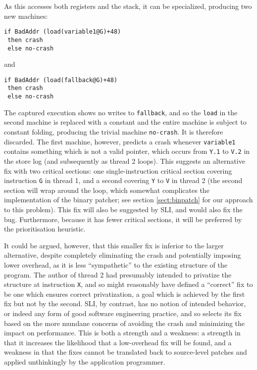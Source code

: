 \documentclass[10pt,twocolumn,preprint,natbib,authoryear]{sigplanconf}
\begin{document}
As this accesses both registers and the stack, it can be specialized,
producing two new machines:

\begin{verbatim}
if BadAddr (load(variable1@G)+48)
 then crash
 else no-crash
\end{verbatim}

and

\begin{verbatim}
if BadAddr (load(fallback@G)+48)
 then crash
 else no-crash
\end{verbatim}

The captured execution shows no writes to \verb|fallback|, and so the
\verb|load| in the second machine is replaced with a constant and the
entire machine is subject to constant folding, producing the trivial
machine \verb|no-crash|.  It is therefore discarded.  The first
machine, however, predicts a crash whenever \verb|variable1| contains
something which is not a valid pointer, which occurs from \verb|Y.1|
to \verb|V.2| in the store log (and subsequently as thread 2 loops).
This suggests an alternative fix with two critical sections: one
single-instruction critical section covering instruction \verb|G| in
thread 1, and a second covering \verb|Y| to \verb|V| in thread 2 (the
second section will wrap around the loop, which somewhat complicates
the implementation of the binary patcher; see section
\ref{sect:binpatch} for our approach to this problem).  This fix will
also be suggested by SLI, and would also fix the bug.  Furthermore,
because it has fewer critical sections, it will be preferred by the
prioritisation heuristic.

It could be argued, however, that this smaller fix is inferior to the
larger alternative, despite completely eliminating the crash and
potentially imposing lower overhead, as it is less ``sympathetic'' to
the existing structure of the program.  The author of thread 2 had
presumably intended to privatize the structure at instruction
\verb|X|, and so might reasonably have defined a ``correct'' fix to be
one which ensures correct privatization, a goal which is achieved by
the first fix but not by the second.  SLI, by contrast, has no notion
of intended behavior, or indeed any form of good software engineering
practice, and so selects its fix based on the more mundane concerns of
avoiding the crash and minimizing the impact on performance.  This is
both a strength and a weakness: a strength in that it increases the
likelihood that a low-overhead fix will be found, and a weakness in
that the fixes cannot be translated back to source-level patches and
applied unthinkingly by the application programmer.
\end{document}
